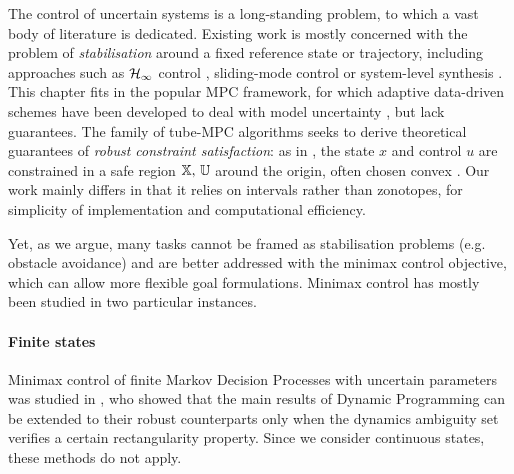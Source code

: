 The control of uncertain systems is a long-standing problem, to which a vast body of literature is dedicated. Existing work is mostly concerned with the problem of \emph{stabilisation} around a fixed reference state or trajectory, including approaches such as $\mathcal{H}_\infty$ control \citep[][]{Basar1996}, sliding-mode control \citep{Lu1997} or system-level synthesis \citep{Dean2017,Dean2018}. This chapter fits in the popular MPC framework, for which adaptive data-driven schemes have been developed to deal with model uncertainty \citep{Sastry1990,Tanaskovic2014,Amos2018}, but lack guarantees. The family of tube-MPC algorithms seeks to derive theoretical guarantees of \emph{robust constraint satisfaction}: as in , the state $x$ and control $u$ are constrained in a safe region $\mathbb{X},\,\mathbb{U}$ around the origin, often chosen convex \citep{Fukushima2007,Adetola2009,Aswani2013,Turchetta2016,Lorenzen2017,Kohler2019,Lu2019}. Our work mainly differs in that it relies on intervals rather than zonotopes, for simplicity of implementation and computational efficiency.

Yet, as we argue, many tasks cannot be framed as stabilisation problems (e.g. obstacle avoidance) and are better addressed with the minimax control objective, which can allow more flexible goal formulations. Minimax control has mostly been studied in two particular instances.

\paragraph{Finite states} Minimax control of finite Markov Decision Processes with uncertain parameters was studied in \citep{Iyengar2005,Nilim2005,Wiesemann2013}, who showed that the main results of Dynamic Programming can be extended to their robust counterparts only when the dynamics ambiguity set verifies a certain rectangularity property. Since we consider continuous states, these methods do not apply.


